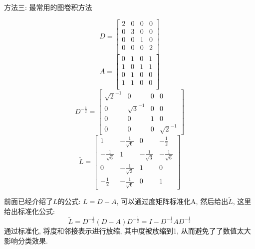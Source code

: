 \documentclass{beamer}
\begin{document}
\begin{frame}{方法三: 最常用的图卷积方法}\footnotesize
    \vspace{-0.5cm}
    \begin{multicols}{2}
        \[
            D =
            \begin{bmatrix}
                2 & 0 & 0 & 0 \\
                0 & 3 & 0 & 0 \\
                0 & 0 & 1 & 0 \\
                0 & 0 & 0 & 2 \\
            \end{bmatrix}
        \]
        \[
            A =
            \begin{bmatrix}
                0 & 1 & 0 & 1 \\
                1 & 0 & 1 & 1 \\
                0 & 1 & 0 & 0 \\
                1 & 1 & 0 & 0 \\
            \end{bmatrix}
        \]
        \[
            D^{-\frac{1}{2}} =
            \begin{bmatrix}
                \sqrt{2}^{-1} & 0             & 0 & 0             \\
                0             & \sqrt{3}^{-1} & 0 & 0             \\
                0             & 0             & 1 & 0             \\
                0             & 0             & 0 & \sqrt{2}^{-1}
            \end{bmatrix}
        \]
        \[
            \tilde{L} = \begin{bmatrix}
                1                   & -\frac{1}{\sqrt{6}} & 0                   & -\frac{1}{2}        \\
                -\frac{1}{\sqrt{6}} & 1                   & -\frac{1}{\sqrt{3}} & -\frac{1}{\sqrt{6}} \\
                0                   & -\frac{1}{\sqrt{3}} & 1                   & 0                   \\
                -\frac{1}{2}        & -\frac{1}{\sqrt{6}} & 0                   & 1
            \end{bmatrix}
        \]

    \end{multicols}
    前面已经介绍了$L$的公式: $L=D-A$, 可以通过度矩阵标准化A, 然后给出$\tilde{L}$, 这里给出标准化公式:
    $$ \tilde{L} = D^{-\frac{1}{2}}(D-A)D^{-\frac{1}{2}} = I - D^{-\frac{1}{2}}AD^{-\frac{1}{2}} $$
    通过标准化, 将度和邻接表示进行放缩, 其中度被放缩到1, 从而避免了了数值太大影响分类效果.\\
\end{frame}
\end{document}
